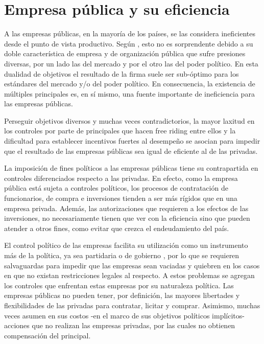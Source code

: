 \documentclass[
  12pt,
  spanish,
]{book}
\begin{document}
\hypertarget{empresa-puxfablica-y-su-eficiencia}{%
\section{Empresa pública y su
eficiencia}\label{empresa-puxfablica-y-su-eficiencia}}

A las empresas públicas, en la mayoría de los países, se las considera
ineficientes desde el punto de vista productivo. Según
\citet{Jones1982}, esto no es sorprendente debido a su doble
característica de empresa y de organización pública que sufre presiones
diversas, por un lado las del mercado y por el otro las del poder
político. En esta dualidad de objetivos el resultado de la firma suele
ser sub-óptimo para los estándares del mercado y/o del poder político.
En consecuencia, la existencia de múltiples principales es, en sí mismo,
una fuente importante de ineficiencia para las empresas públicas.

Perseguir objetivos diversos y muchas veces contradictorios, la mayor
laxitud en los controles por parte de principales que hacen free riding
entre ellos y la dificultad para establecer incentivos fuertes al
desempeño se asocian para impedir que el resultado de las empresas
públicas sea igual de eficiente al de las privadas.

La imposición de fines políticos a las empresas públicas
\citep{Shleifer1994} tiene su contrapartida en controles diferenciados
respecto a las privadas. En efecto, como la empresa pública está sujeta
a controles políticos, los procesos de contratación de funcionarios, de
compra e inversiones tienden a ser más rígidos que en una empresa
privada. Además, las autorizaciones que requieren a los efectos de las
inversiones, no necesariamente tienen que ver con la eficiencia sino que
pueden atender a otros fines, como evitar que crezca el endeudamiento
del país.

El control político de las empresas facilita su utilización como un
instrumento más de la política, ya sea partidaria o de gobierno
\citep{Miltnisky2001}, por lo que se requieren salvaguardas para impedir
que las empresas sean vaciadas y quiebren en los casos en que no existan
restricciones legales al respecto. A estos problemas se agregan los
controles que enfrentan estas empresas por su naturaleza política. Las
empresas públicas no pueden tener, por definición, las mayores
libertades y flexibilidades de las privadas para contratar, licitar y
comprar. Asimismo, muchas veces asumen en sus costos -en el marco de sus
objetivos políticos implícitos- acciones que no realizan las empresas
privadas, por las cuales no obtienen compensación del principal.
\end{document}
